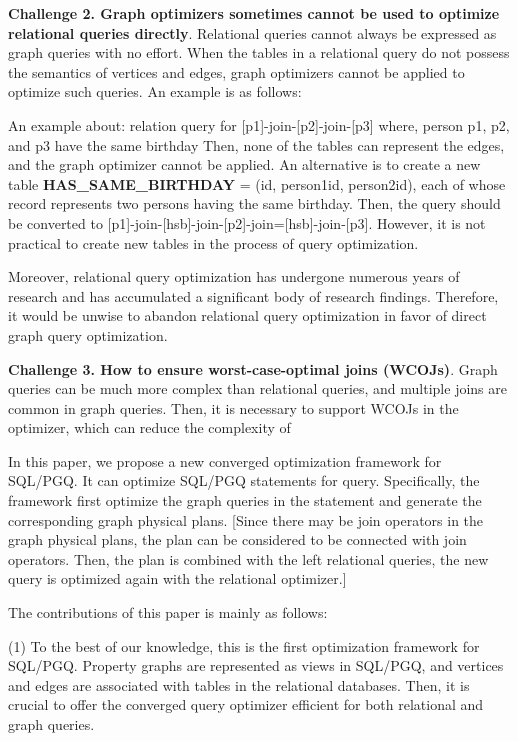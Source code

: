 \textbf{Challenge 2. Graph optimizers sometimes cannot be used to optimize relational queries directly}.
Relational queries cannot always be expressed as graph queries with no effort.
When the tables in a relational query do not possess the semantics of vertices and edges, graph optimizers cannot be applied to optimize such queries.
An example is as follows:

\begin{example}
    An example about:
    relation query for [p1]-join-[p2]-join-[p3]
    where, person p1, p2, and p3 have the same birthday
    Then, none of the tables can represent the edges, and the graph optimizer cannot be applied.
    An alternative is to create a new table \textbf{HAS\_SAME\_BIRTHDAY} = (id, person1id, person2id), each of whose record represents two persons having the same birthday.
    Then, the query should be converted to [p1]-join-[hsb]-join-[p2]-join=[hsb]-join-[p3].
    However, it is not practical to create new tables in the process of query optimization.
\end{example}

Moreover, relational query optimization has undergone numerous years of research and has accumulated a significant body of research findings.
Therefore, it would be unwise to abandon relational query optimization in favor of direct graph query optimization.


\textbf{Challenge 3. How to ensure worst-case-optimal joins (WCOJs)}.
Graph queries can be much more complex than relational queries, and multiple joins are common in graph queries.
Then, it is necessary to support WCOJs in the optimizer, which can reduce the complexity of 


In this paper, we propose a new converged optimization framework for SQL/PGQ.
It can optimize SQL/PGQ statements for query.
Specifically, the framework first optimize the graph queries in the statement and generate the corresponding graph physical plans.
[Since there may be join operators in the graph physical plans, the plan can be considered to be connected with join operators.
Then, the plan is combined with the left relational queries, the new query is optimized again with the relational optimizer.]

The contributions of this paper is mainly as follows:

(1) To the best of our knowledge, this is the first optimization framework for SQL/PGQ.
Property graphs are represented as views in SQL/PGQ, and vertices and edges are associated with tables in the relational databases.
Then, it is crucial to offer the converged query optimizer efficient for both relational and graph queries.

